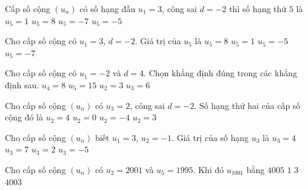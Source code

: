 \begin{ex}%
	Cấp  số cộng $(u_n)$ có số hạng đầu $u_1=3$, công sai $d=-2$ thì số hạng thứ $5$ là
	 \choice
		{$u_5=1$} 
		{$u_5=8$} 
		{$u_5=-7$} 
		{\True $u_5=-5$} 
\end{ex}

\begin{ex}%
	Cho  cấp số cộng có $u_1=3$, $d=-2$. Giá trị của $u_5$ là
	\choice 
		{$u_5=8$} 
		 {$u_5=1$}
		 {\True $u_5=-5$}
		 {$u_5=-7$}
\end{ex}

\begin{ex}%
	Cho cấp số cộng có $u_1=-2$ và $d=4$.  Chọn khẳng định đúng trong các khẳng định sau.
	 \choice
		 {$u_4=8$}
		{$u_5=15$} 
		 {$u_2=3$}
		 {\True $u_3=6$}
\end{ex}

\begin{ex}%
	Cho cấp số  cộng $(u_n)$ có $u_3=2$, công sai $d=-2$. Số hạng thứ hai của cấp số cộng đó là
	\choice 
		 {\True $u_2=4$}
		 {$u_2=0$}
		{$u_2=-4$} 
		{$u_2=3$} 
\end{ex}

\begin{ex}%
	Cho cấp số cộng $(u_n)$  biết $u_1=3$, $u_2=-1$. Giá trị của số hạng $u_3$ là
	\choice 
		{$u_3=4$} 
		{$u_3=7$} 
		{$u_3=2$} 
		{\True $u_3=-5$} 
\end{ex}

\begin{ex}%
	Cho cấp số cộng $(u_n)$ có $u_2=2001$  và $u_5=1995$. Khi đó $u_{1001}$ bằng
	\choice 
		{$4005$} 
		{$1$} 
		{\True  $3$}
		 {$4003$}
\end{ex}

